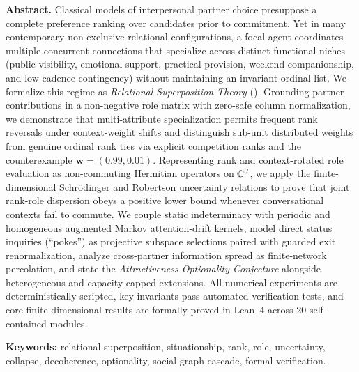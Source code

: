 \begin{titlepage}
\vspace{0.95cm}
\begin{minipage}{0.90\textwidth}
\small
\noindent\textbf{Abstract.}\;
Classical models of interpersonal partner choice presuppose a complete preference
ranking over candidates prior to commitment. Yet in many contemporary non-exclusive
relational configurations, a focal agent coordinates multiple concurrent connections
that specialize across distinct functional niches (public visibility, emotional support,
practical provision, weekend companionship, and low-cadence contingency) without
maintaining an invariant ordinal list. We formalize this regime as \emph{Relational
Superposition Theory} (\RST). Grounding partner contributions in a non-negative
role matrix with zero-safe column normalization, we demonstrate that multi-attribute
specialization permits frequent rank reversals under context-weight shifts and distinguish
sub-unit distributed weights from genuine ordinal rank ties via explicit competition
ranks and the counterexample $\mathbf{w} = (0.99, 0.01)$. Representing rank and
context-rotated role evaluation as non-commuting Hermitian operators on $\mathbb{C}^d$, we
apply the finite-dimensional Schr\"odinger and Robertson uncertainty relations to prove
that joint rank-role dispersion obeys a positive lower bound whenever conversational
contexts fail to commute. We couple static indeterminacy with periodic and homogeneous
augmented Markov attention-drift kernels, model direct status inquiries (``pokes'') as
projective subspace selections paired with guarded exit renormalization, analyze
cross-partner information spread as finite-network percolation, and state the
\emph{Attractiveness-Optionality Conjecture} alongside heterogeneous and capacity-capped
extensions. All numerical experiments are deterministically scripted, key invariants
pass automated verification tests, and core finite-dimensional results are formally
proved in Lean~4 across $20$ self-contained modules.
\end{minipage}

\vspace{0.75cm}
\begin{minipage}{0.90\textwidth}
\small
\noindent\textbf{Keywords:} relational superposition, situationship, rank, role,
uncertainty, collapse, decoherence, optionality, social-graph cascade, formal verification.
\end{minipage}

\vfill
\end{titlepage}

